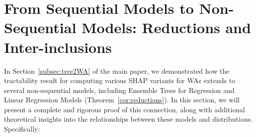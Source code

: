  \section{From Sequential Models to Non-Sequential Models: Reductions and Inter-inclusions} \label{app:reductiontree}


In Section~\ref{subsec:tree2WA} of the main paper, we demonstrated how the tractability result for computing various SHAP variants for WAs extends to several non-sequential models, including Ensemble Trees for Regression and Linear Regression Models (Theorem~\ref{cor:reductions}). In this section, we will present a complete and rigorous proof of this connection, along with additional theoretical insights into the relationships between these models and distributions. Specifically:




